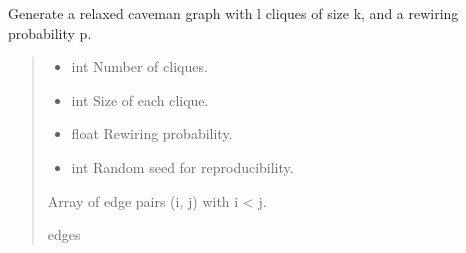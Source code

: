 \documentclass[letterpaper,10pt,english]{sphinxmanual}
\begin{document}
\begin{fulllineitems}
\label{\detokenize{api_reference:graphem.generators.generate_relaxed_caveman}}
\pysigstartsignatures
{}
\pysigstopsignatures
\sphinxAtStartPar
Generate a relaxed caveman graph with l cliques of size k,
and a rewiring probability p.
\begin{quote}\begin{description}
\begin{itemize}
\item {} 
\sphinxAtStartPar
{} \textendash{} int
Number of cliques.

\item {} 
\sphinxAtStartPar
{} \textendash{} int
Size of each clique.

\item {} 
\sphinxAtStartPar
{} \textendash{} float
Rewiring probability.

\item {} 
\sphinxAtStartPar
{} \textendash{} int
Random seed for reproducibility.

\end{itemize}

\sphinxAtStartPar
\begin{description}
\sphinxAtStartPar
Array of edge pairs (i, j) with i \textless{} j.

\end{description}


\sphinxAtStartPar
edges

\end{description}\end{quote}

\end{fulllineitems}
\end{document}
